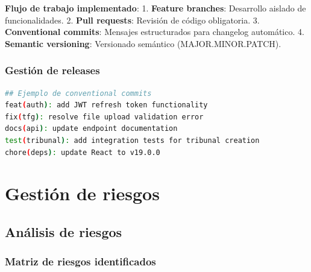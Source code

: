 \documentclass[12pt,a4paper,oneside]{report}
\begin{document}
\textbf{Flujo de trabajo implementado}: 1. \textbf{Feature branches}:
Desarrollo aislado de funcionalidades. 2. \textbf{Pull requests}:
Revisión de código obligatoria. 3. \textbf{Conventional commits}:
Mensajes estructurados para changelog automático. 4. \textbf{Semantic
versioning}: Versionado semántico (MAJOR.MINOR.PATCH).

\subsubsection{Gestión de releases}\label{gestiuxf3n-de-releases}

\begin{lstlisting}[language=bash]
## Ejemplo de conventional commits
feat(auth): add JWT refresh token functionality
fix(tfg): resolve file upload validation error
docs(api): update endpoint documentation
test(tribunal): add integration tests for tribunal creation
chore(deps): update React to v19.0.0
\end{lstlisting}

\section{Gestión de riesgos}\label{gestiuxf3n-de-riesgos}

\subsection{Análisis de riesgos}\label{anuxe1lisis-de-riesgos}

\subsubsection{Matriz de riesgos
identificados}\label{matriz-de-riesgos-identificados}
\end{document}
